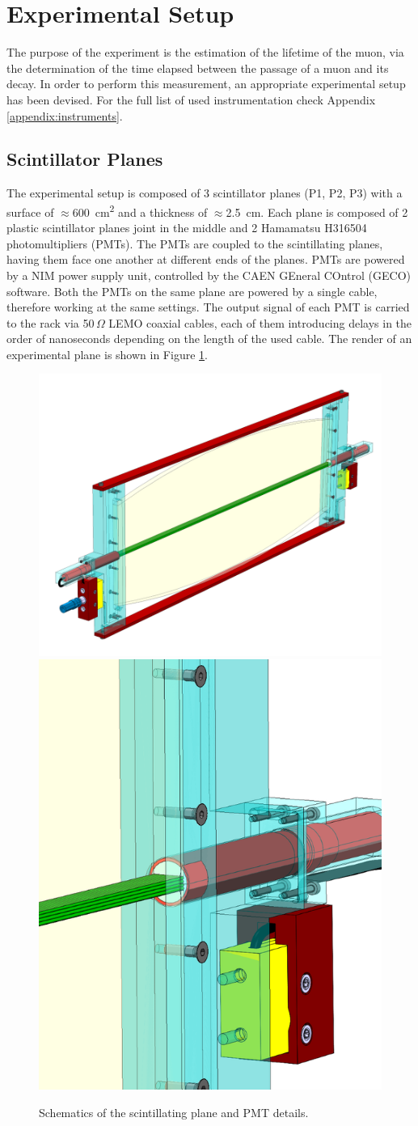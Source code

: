 \documentclass[../main.tex]{subfiles}
\begin{document}
\section{Experimental Setup}
The purpose of the experiment is the estimation of the lifetime of the muon, via the determination of the time elapsed between the passage of a muon and its decay. In order to perform this measurement, an appropriate experimental setup has been devised. For the full list of used instrumentation check Appendix \ref{appendix:instruments}.


\subsection{Scintillator Planes}
The experimental setup is composed of 3 scintillator planes (P1, P2, P3) with a surface of \mbox{$\approx$\SI{600}{\centi \metre^2}} and a thickness of $\approx$\SI{2.5}{\centi \metre}. 
Each plane is composed of 2 plastic scintillator planes joint in the middle and 2 Hamamatsu H316504 photomultipliers (PMTs). The PMTs are coupled to the scintillating planes, having them face one another at different ends of the planes. PMTs are powered by a NIM power supply unit, controlled by the CAEN GEneral COntrol (GECO) software. Both the PMTs on the same plane are powered by a single cable, therefore working at the same settings. The output signal of each PMT is carried to the rack via 50\,$\Omega$ LEMO coaxial cables, each of them introducing delays in the order of nanoseconds depending on the length of the used cable. The render of an experimental plane is shown in Figure \ref{fig:plane}.

\begin{figure}[htb]
    \centering
    \includegraphics[width=0.5 \linewidth]{images/plane.png} \hspace{0.3 cm}
    \includegraphics[width=0.3 \linewidth]{images/plane3.png}
    \caption{Schematics of the scintillating plane and PMT details.}
    \label{fig:plane}
\end{figure}
\end{document}
